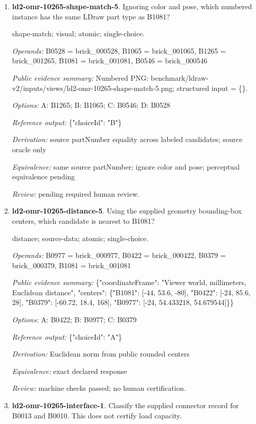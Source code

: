 \begin{enumerate}
\item \textbf{ld2-omr-10265-shape-match-5}. Ignoring color and pose, which numbered instance has the same LDraw part type as B1081?
\par{\small shape-match; visual; atomic; single-choice.\par\textit{Operands:} B0528 = brick\_000528, B1065 = brick\_001065, B1265 = brick\_001265, B1081 = brick\_001081, B0546 = brick\_000546\par\textit{Public evidence summary:} Numbered PNG: benchmark/ldraw-v2/inputs/views/ld2-omr-10265-shape-match-5.png; structured input = \{\}.\par\textit{Options:} A: B1265; B: B1065; C: B0546; D: B0528\par\textit{Reference output:} \{"choiceId": "B"\}\par\textit{Derivation:} source partNumber equality across labeled candidates; source oracle only\par\textit{Equivalence:} same source partNumber; ignore color and pose; perceptual equivalence pending\par\textit{Review:} pending required human review.}
\item \textbf{ld2-omr-10265-distance-5}. Using the supplied geometry bounding-box centers, which candidate is nearest to B1081?
\par{\small distance; source-data; atomic; single-choice.\par\textit{Operands:} B0977 = brick\_000977, B0422 = brick\_000422, B0379 = brick\_000379, B1081 = brick\_001081\par\textit{Public evidence summary:} \{"coordinateFrame": "Viewer world, millimeters, Euclidean distance", "centers": \{"B1081": [-44, 53.6, -80], "B0422": [-24, 85.6, 28], "B0379": [-60.72, 18.4, 168], "B0977": [-24, 54.433218, 54.679544]\}\}\par\textit{Options:} A: B0422; B: B0977; C: B0379\par\textit{Reference output:} \{"choiceId": "A"\}\par\textit{Derivation:} Euclidean norm from public rounded centers\par\textit{Equivalence:} exact declared response\par\textit{Review:} machine checks passed; no human certification.}
\item \textbf{ld2-omr-10265-interface-1}. Classify the supplied connector record for B0013 and B0010. This does not certify load capacity.

\end{enumerate}
